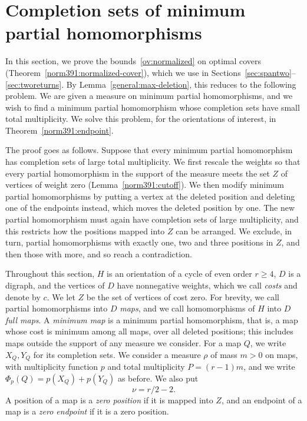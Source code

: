 \section{Completion sets of minimum partial homomorphisms}\label{norm391:section}
In this section, we prove the bounds~\eqref{ov:normalized} on optimal covers (Theorem~\ref{norm391:normalized-cover}), which we use in Sections~\ref{sec:spantwo}--\ref{sec:tworeturns}. By Lemma~\ref{general:max-deletion}, this reduces to the following problem. We are given a measure on minimum partial homomorphisms, and we wish to find a minimum partial homomorphism whose completion sets have small total multiplicity. We solve this problem, for the orientations of interest, in Theorem~\ref{norm391:endpoint}.

The proof goes as follows. Suppose that every minimum partial homomorphism has completion sets of large total multiplicity. We first rescale the weights so that every partial homomorphism in the support of the measure meets the set $Z$ of vertices of weight zero (Lemma~\ref{norm391:cutoff}). We then modify minimum partial homomorphisms by putting a vertex at the deleted position and deleting one of the endpoints instead, which moves the deleted position by one. The new partial homomorphism must again have completion sets of large multiplicity, and this restricts how the positions mapped into $Z$ can be arranged. We exclude, in turn, partial homomorphisms with exactly one, two and three positions in $Z$, and then those with more, and so reach a contradiction.

\medskip

Throughout this section, $H$ is an orientation of a cycle of even order $r\ge4$, $D$ is a digraph, and the vertices of $D$ have nonnegative weights, which we call \emph{costs} and denote by $c$. We let $Z$ be the set of vertices of cost zero.
For brevity, we call partial homomorphisms into $D$ \emph{maps}, and we call homomorphisms of $H$ into $D$ \emph{full maps}. A \emph{minimum map} is a minimum partial homomorphism, that is, a map whose cost is minimum among all maps, over all deleted positions; this includes maps outside the support of any measure we consider.
For a map $Q$, we write $X_Q,Y_Q$ for
its completion sets. We consider a measure $\rho$
of mass $m>0$ on maps, with multiplicity function $p$ and total multiplicity
$P=(r-1)m$, and we write $\Phi_p(Q)=p(X_Q)+p(Y_Q)$ as before. We also put
\[
\nu=r/2-2.
\]
A position of a map is a \emph{zero position} if it is mapped into $Z$, and an endpoint of a map is a \emph{zero endpoint} if it is a zero position.

